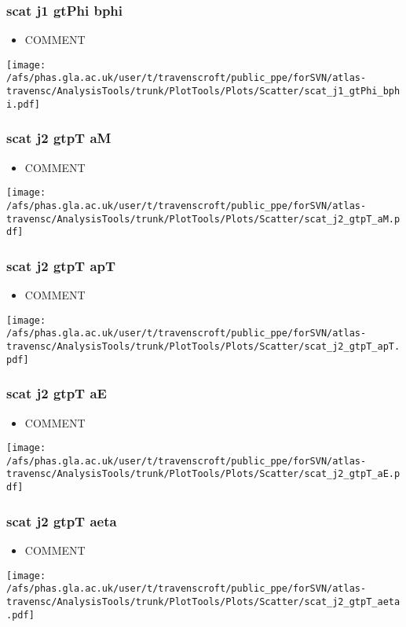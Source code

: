 \documentclass{beamer}
\begin{document}
\begin{frame}
\frametitle{scat j1 gtPhi bphi}
\begin{itemize}
\item COMMENT
\end{itemize}
\begin{center}
\texttt{[image: /afs/phas.gla.ac.uk/user/t/travenscroft/public\_ppe/forSVN/atlas-travensc/AnalysisTools/trunk/PlotTools/Plots/Scatter/scat\_j1\_gtPhi\_bphi.pdf]}
\end{center}
\end{frame}

\begin{frame}
\frametitle{scat j2 gtpT aM}
\begin{itemize}
\item COMMENT
\end{itemize}
\begin{center}
\texttt{[image: /afs/phas.gla.ac.uk/user/t/travenscroft/public\_ppe/forSVN/atlas-travensc/AnalysisTools/trunk/PlotTools/Plots/Scatter/scat\_j2\_gtpT\_aM.pdf]}
\end{center}
\end{frame}

\begin{frame}
\frametitle{scat j2 gtpT apT}
\begin{itemize}
\item COMMENT
\end{itemize}
\begin{center}
\texttt{[image: /afs/phas.gla.ac.uk/user/t/travenscroft/public\_ppe/forSVN/atlas-travensc/AnalysisTools/trunk/PlotTools/Plots/Scatter/scat\_j2\_gtpT\_apT.pdf]}
\end{center}
\end{frame}

\begin{frame}
\frametitle{scat j2 gtpT aE}
\begin{itemize}
\item COMMENT
\end{itemize}
\begin{center}
\texttt{[image: /afs/phas.gla.ac.uk/user/t/travenscroft/public\_ppe/forSVN/atlas-travensc/AnalysisTools/trunk/PlotTools/Plots/Scatter/scat\_j2\_gtpT\_aE.pdf]}
\end{center}
\end{frame}

\begin{frame}
\frametitle{scat j2 gtpT aeta}
\begin{itemize}
\item COMMENT
\end{itemize}
\begin{center}
\texttt{[image: /afs/phas.gla.ac.uk/user/t/travenscroft/public\_ppe/forSVN/atlas-travensc/AnalysisTools/trunk/PlotTools/Plots/Scatter/scat\_j2\_gtpT\_aeta.pdf]}
\end{center}
\end{frame}
\end{document}
